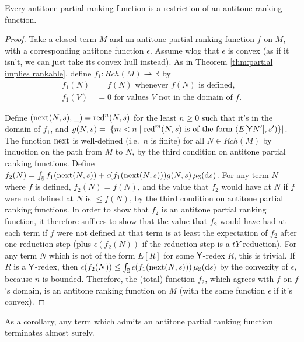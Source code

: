 \begin{theorem}  \label{thm:antitone partial implies rankable}
  Every antitone partial ranking function is a restriction of an antitone ranking function.
\end{theorem}
\begin{proof}
  Take a closed term $M$ and an antitone partial ranking function $f$ on $M$, with a corresponding antitone function $\epsilon$. Assume wlog that $\epsilon$ is convex (as if it isn't, we can just take its convex hull instead). As in Theorem \ref{thm:partial implies rankable}, define $f_1 : Rch(M) \rightharpoonup \mathbb R$ by
  \begin{align*}
    f_1(N) &= f(N) \text{ whenever $f(N)$ is defined},\\
    f_1(V) &= 0 \text{ for values $V$ not in the domain of $f$.}
  \end{align*}

  Define $(\operatorname{next}(N,s),\_) = \operatorname{red}^n(N,s)$ for the least $n \geq 0$ such that it's in the domain of $f_1$, and $g(N,s) = \left | \{m < n \mid \operatorname{red}^m(N,s) \text{ is of the form } (E[\mathsf{Y} N'],s') \} \right |$. 
  The function $\operatorname{next}$ is well-defined (i.e.~$n$ is finite) for all $N \in Rch(M)$ by induction on the path from $M$ to $N$, by the third condition on antitone partial ranking functions. Define $f_2(N) = \int_{\mathbb{S}} f_1(\operatorname{next}(N,s)) + \epsilon(f_1(\operatorname{next}(N,s))) g(N,s) \, \mu_{{\mathbb{S}}}(\mathrm d s)$. For any term $N$ where $f$ is defined, $f_2(N) = f(N)$, and the value that $f_2$ would have at $N$ if $f$ were not defined at $N$ is $\leq f(N)$, by the third condition on antitone partial ranking functions. In order to show that $f_2$ is an antitone partial ranking function, it therefore suffices to show that the value that $f_2$ would have had at each term if $f$ were not defined at that term is at least the expectation of $f_2$ after one reduction step (plus $\epsilon(f_2(N))$ if the reduction step is a $tY$-reduction). For any term $N$ which is not of the form $E[R]$ for some $\mathsf{Y}$-redex $R$, this is trivial. If $R$ is a $\mathsf{Y}$-redex, then $\epsilon(f_2(N)) \leq \int_{\mathbb{S}} \epsilon(f_1(\operatorname{next}(N,s)))\, \mu_{{\mathbb{S}}}(\mathrm d s)$ by the convexity of $\epsilon$, because $n$ is bounded. Therefore, the (total) function $f_2$, which agrees with $f$ on $f$'s domain, is an antitone ranking function on $M$ (with the same function $\epsilon$ if it's convex).
\end{proof}

As a corollary, any term which admits an antitone partial ranking function terminates almost surely.

